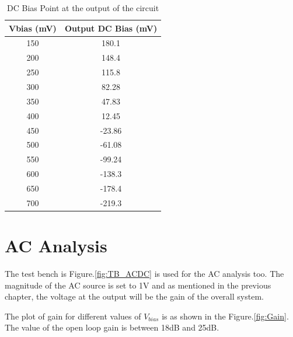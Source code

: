\begin{table} [H]
\centering
\begin{tabular}{@{}cc@{}}
\toprule
Vbias (mV)			& Output DC Bias (mV)	\\ \midrule
150					& 180.1  \\
200					& 148.4  \\
250					& 115.8  \\
300					& 82.28	 \\
350					& 47.83	 \\
400					& 12.45	 \\
450					& -23.86 \\
500					& -61.08 \\
550					& -99.24 \\
600					& -138.3 \\
650					& -178.4 \\
700 				& -219.3 \\
\bottomrule
\end{tabular}
\caption{DC Bias Point at the output of the circuit}
\label{tab:DC}
\end{table}


\section{AC Analysis}

The test bench is Figure.\ref{fig:TB_ACDC} is used for the AC analysis too. The magnitude of the AC source is set to 1V and as mentioned in the previous chapter, the voltage at the output will be the gain of the overall system.

The plot of gain for different values of $V_{bias}$ is as shown in the Figure.\ref{fig:Gain}. The value of the open loop gain is between 18dB and 25dB.

